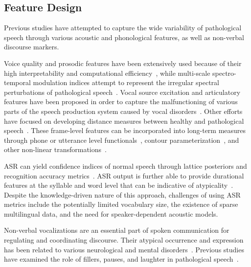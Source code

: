 \documentclass{article}
\begin{document}
\subsection{Feature Design}
Previous studies have attempted to capture the wide variability of pathological speech through various acoustic and phonological features, as well as non-verbal discourse markers.

Voice quality and prosodic features have been extensively used because of their high interpretability and computational efficiency~\cite{van2010computational,tsanas2012novel,bone2014psychologist}, while multi-scale spectro-temporal modulation indices attempt to represent the irregular spectral perturbations of pathological speech~\cite{liss2010discriminating,falk2012characterization,williamson2015automatic}. Vocal source excitation and articulatory features have been proposed in order to capture the malfunctioning of various parts of the speech production system caused by vocal disorders~\cite{falk2012characterization,hahm2015parkinson}. Other efforts have focused on developing distance measures between healthy and pathological speech~\cite{gu2005disordered}. These frame-level features can be incorporated into long-term measures through phone or utterance level functionals~\cite{kim2015automatic}, contour parameterization~\cite{kim2015automatic2}, and other non-linear transformations~\cite{kim2015automatic,an2015automatic,middag2011combining}.

ASR can yield confidence indices of normal speech through lattice posteriors and recognition accuracy metrics~\cite{kim2015automatic,zlotnik2015random,maier2009peaks,sharma2009universal,middag2009automated}. ASR output is further able to provide durational features at the syllable and word level that can be indicative of atypicality~\cite{an2015automatic,duez2006consonant}. Despite the knowledge-driven nature of this approach, challenges of using ASR metrics include the potentially limited vocabulary size, the existence of sparse multilingual data, and the need for speaker-dependent acoustic models.

Non-verbal vocalizations are an essential part of spoken communication for regulating and coordinating discourse. Their atypical occurrence and expression has been related to various neurological and mental disorders~\cite{lake2011listener}. Previous studies have examined the role of fillers, pauses, and laughter in pathological speech~\cite{heeman2010autism,lake2011listener,gupta2014predicting}.
\end{document}
